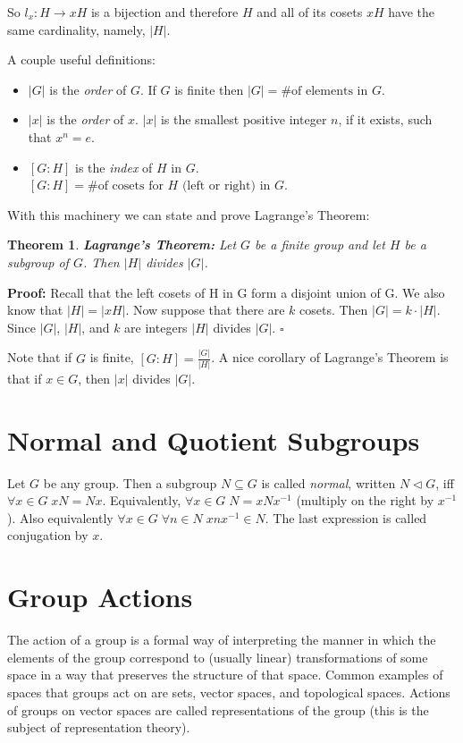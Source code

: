 \documentclass[11pt, oneside]{article}   	%
\newtheorem{thm}{Theorem}[section]
\theoremstyle{definition}
\begin{document}
\noindent
So $l_x: H \rightarrow xH$ is a bijection and therefore $H$ and all of its cosets $xH$ have the same cardinality, namely, $|H|$.


\bigskip
\noindent
A couple useful definitions:

\begin{itemize}
\item $| G |$ is the \emph{order} of $G$. If $G$ is finite then $|G| = \text{\# of elements in } G$.
\item $| x |$ is the \emph{order} of $x$.  $|x|$ is the smallest positive integer $n$, if it exists, such that $x^n = e$.
\item $[G:H]$ is the \emph{index} of $H$ in $G$. $[G:H] =  \text{\# of cosets for $H$ (left or right) in $G$}$.
\end{itemize}

\bigskip
\noindent
With this machinery we can state and prove Lagrange's Theorem:

\bigskip
\noindent
\begin{thm}
\textbf{Lagrange's Theorem:}  Let  $G$ be a finite group and let $H$ be a subgroup of $G$. Then $|H|$ divides $|G|$. 
\label{thm:lagrange}
\end{thm}

\bigskip
\noindent
\textbf{Proof:} Recall that the left cosets of H in G form a disjoint union of G. We also know that $|H| = |xH|$. Now suppose that there are $k$ cosets. 
Then $|G| = k \cdot |H|$. Since $|G|$, $|H|$, and $k$ are integers $|H|$ divides $|G|$. $\square$

\bigskip
\noindent
Note that if $G$ is finite, $[G:H] = \frac{|G|}{|H|}$. A nice corollary of Lagrange's Theorem is that if $x \in G$, then $|x|$ divides $|G|$.

\section{Normal and Quotient Subgroups}
Let $G$ be any group. Then a subgroup $N \subseteq G$ is called \emph{normal}, written $N  \lhd G$, iff $\forall x \in G \; xN = Nx$. Equivalently,
$\forall x \in G \; N = xNx^{-1}$ (multiply on the right by $x^{-1}$). Also equivalently $\forall x \in G \;  \forall n \in N \; x n x^{-1} \in N$. The last expression
is called conjugation by $x$.


\section{Group Actions}
The action of a group is a formal way of interpreting the manner in which the elements of the group correspond to (usually linear) transformations of some space 
in a way that preserves the structure of that space. Common examples of spaces that groups act on are sets, vector spaces, and topological spaces. 
Actions of groups on vector spaces are called representations of the group (this is the subject of representation theory).
\end{document}
